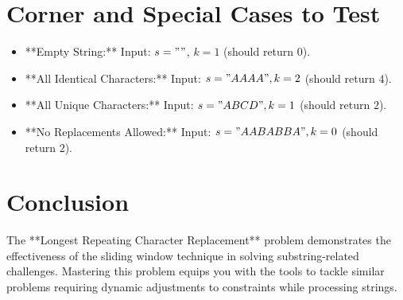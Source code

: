 \section*{Corner and Special Cases to Test}
\begin{itemize}
    \item **Empty String:** Input: \( s = "" \), \( k = 1 \) (should return \(0\)).
    \item **All Identical Characters:** Input: \( s = "AAAA", k = 2 \) (should return \(4\)).
    \item **All Unique Characters:** Input: \( s = "ABCD", k = 1 \) (should return \(2\)).
    \item **No Replacements Allowed:** Input: \( s = "AABABBA", k = 0 \) (should return \(2\)).
\end{itemize}

\section*{Conclusion}
The **Longest Repeating Character Replacement** problem demonstrates the effectiveness of the sliding window technique in solving substring-related challenges. Mastering this problem equips you with the tools to tackle similar problems requiring dynamic adjustments to constraints while processing strings.